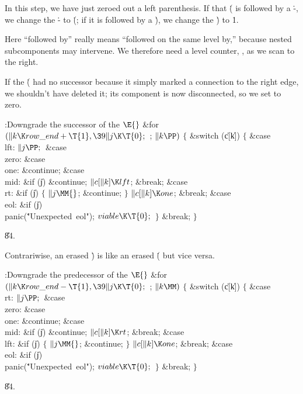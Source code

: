 In this step, we have just zeroed out a left parenthesis.
If that \.( is followed by a \.-, we change the \.- to \.(;
if it is followed by a \.), we change the \.) to \.1.

Here ``followed by'' really means ``followed on the same level by,'' because
nested subcomponents may intervene. We therefore need a level counter, ,
as we scan to the right.

If the \.( had no successor because it simply marked a connection to the
right edge, we shouldn't have deleted it; its component is now disconnected,
so we set  to zero.

\Y\B\4:Downgrade the successor of the \X${}\E{}$\6
\&{for} ${}(\|k\K\\{row\_end}+\T{1},\39\|j\K\T{0};{}$  ; ${}\|k\PP){}$\5
${}\{{}$\1\6
\&{switch} (\|c[\|k])\5
${}\{{}$\1\6
\4\&{case} \\{lft}:\5
${}\|j\PP;{}$\6
\4\&{case} \\{zero}:\5
\&{case} \\{one}:\5
\&{continue};\6
\4\&{case} \\{mid}:\5
\&{if} (\|j)\1\5
\&{continue};\2\6
${}\|c[\|k]\K\\{lft}{}$;\5
\&{break};\6
\4\&{case} \\{rt}:\5
\&{if} (\|j)\5
${}\{{}$\5
\1${}\|j\MM{}$;\5
\&{continue};\5
${}\}{}$\2\6
${}\|c[\|k]\K\\{one}{}$;\5
\&{break};\6
\4\&{case} \\{eol}:\5
\&{if} (\|j)\1\5
\\{panic}(\.{"Unexpected\ eol"});\2\6
${}\\{viable}\K\T{0};{}$\6
\4${}\}{}$\2\6
\&{break};\6
\4${}\}{}$\2\par
\U84.\fi

Contrariwise, an erased \.) is like an erased \.( but
vice versa.

\Y\B\4:Downgrade the predecessor of the \X${}\E{}$\6
\&{for} ${}(\|k\K\\{row\_end}-\T{1},\39\|j\K\T{0};{}$  ; ${}\|k\MM){}$\5
${}\{{}$\1\6
\&{switch} (\|c[\|k])\5
${}\{{}$\1\6
\4\&{case} \\{rt}:\5
${}\|j\PP;{}$\6
\4\&{case} \\{zero}:\5
\&{case} \\{one}:\5
\&{continue};\6
\4\&{case} \\{mid}:\5
\&{if} (\|j)\1\5
\&{continue};\2\6
${}\|c[\|k]\K\\{rt}{}$;\5
\&{break};\6
\4\&{case} \\{lft}:\5
\&{if} (\|j)\5
${}\{{}$\5
\1${}\|j\MM{}$;\5
\&{continue};\5
${}\}{}$\2\6
${}\|c[\|k]\K\\{one}{}$;\5
\&{break};\6
\4\&{case} \\{eol}:\5
\&{if} (\|j)\1\5
\\{panic}(\.{"Unexpected\ eol"});\2\6
${}\\{viable}\K\T{0};{}$\6
\4${}\}{}$\2\6
\&{break};\6
\4${}\}{}$\2\par
\U84.\fi

